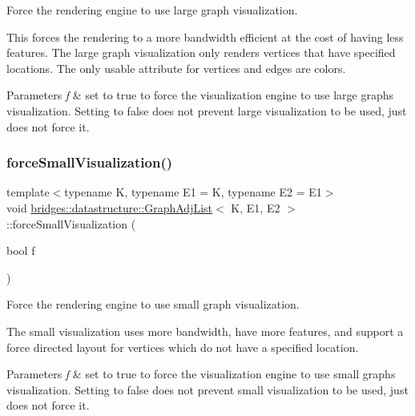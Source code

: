 Force the rendering engine to use large graph visualization. 

This forces the rendering to a more bandwidth efficient at the cost of having less features. The large graph visualization only renders vertices that have specified locations. The only usable attribute for vertices and edges are colors.


\begin{DoxyParams}{Parameters}
{\em f} & set to true to force the visualization engine to use large graphs visualization. Setting to false does not prevent large visualization to be used, just does not force it. \\
\hline
\end{DoxyParams}
\mbox{\label{classbridges_1_1datastructure_1_1_graph_adj_list_a9706e3df7d30320b7e7773a6423e4ff7}} 
\subsubsection{\texorpdfstring{force\+Small\+Visualization()}{forceSmallVisualization()}}
{\footnotesize\ttfamily template$<$typename K, typename E1 = K, typename E2 = E1$>$ \\
void \hyperlink{classbridges_1_1datastructure_1_1_graph_adj_list}{bridges\+::datastructure\+::\+Graph\+Adj\+List}$<$ K, E1, E2 $>$\+::force\+Small\+Visualization (\begin{DoxyParamCaption}\item[{bool}]{f }\end{DoxyParamCaption})\hspace{0.3cm}{\ttfamily [inline]}}



Force the rendering engine to use small graph visualization. 

The small visualization uses more bandwidth, have more features, and support a force directed layout for vertices which do not have a specified location.


\begin{DoxyParams}{Parameters}
{\em f} & set to true to force the visualization engine to use small graphs visualization. Setting to false does not prevent small visualization to be used, just does not force it. \\
\hline
\end{DoxyParams}
\mbox{\label{classbridges_1_1datastructure_1_1_graph_adj_list_a23dad50371f073dd9a2f48e83720e86c}} 
